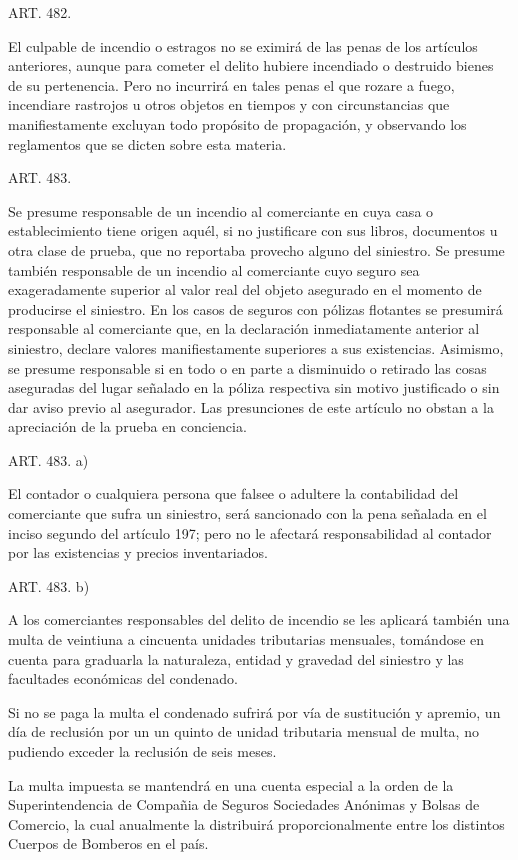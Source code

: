     ART. 482.

    El culpable de incendio o estragos no se eximirá de las penas de los artículos anteriores, aunque para cometer el delito hubiere incendiado o destruido bienes de su pertenencia.
    Pero no incurrirá en tales penas el que rozare a fuego, incendiare rastrojos u otros objetos en tiempos y con circunstancias que manifiestamente excluyan todo propósito de propagación, y observando los reglamentos que se dicten sobre esta materia.



    ART. 483.

    Se presume responsable de un incendio al comerciante en cuya casa o establecimiento tiene origen aquél, si no justificare con sus libros, documentos u otra clase de prueba, que no reportaba provecho alguno del siniestro.
    Se presume también responsable de un incendio al comerciante cuyo seguro sea exageradamente superior al valor real del objeto asegurado en el momento de producirse el siniestro. En los casos de seguros con pólizas flotantes se presumirá responsable al comerciante que, en la declaración inmediatamente anterior al siniestro, declare valores manifiestamente superiores a sus existencias. Asimismo, se presume responsable si en todo o en parte a disminuido o retirado las cosas aseguradas del lugar señalado en la póliza respectiva sin motivo justificado o sin dar aviso previo al asegurador.
    Las presunciones de este artículo no obstan a la apreciación de la prueba en conciencia.

    ART. 483. a)

    El contador o cualquiera persona que falsee o adultere la contabilidad del comerciante que sufra un siniestro, será sancionado con la pena señalada en el inciso segundo del artículo 197; pero no le afectará responsabilidad al contador por las existencias y precios inventariados.

    ART. 483. b)

    A los comerciantes responsables del delito de incendio se les aplicará también una multa de veintiuna a cincuenta unidades tributarias mensuales, tomándose en cuenta para graduarla la naturaleza, entidad y gravedad del siniestro y las facultades económicas del condenado.

    Si no se paga la multa el condenado sufrirá por vía de sustitución y apremio, un día de reclusión por un un quinto de unidad tributaria mensual de multa, no pudiendo exceder la reclusión de seis meses.

    La multa impuesta se mantendrá en una cuenta especial a la orden de la Superintendencia de Compañia de Seguros Sociedades Anónimas y Bolsas de Comercio, la cual anualmente la distribuirá proporcionalmente entre los distintos Cuerpos de Bomberos en el país.

